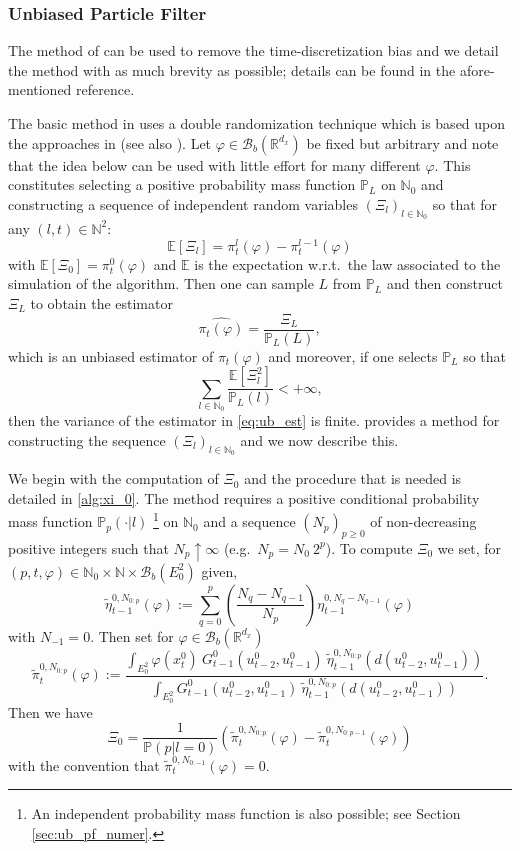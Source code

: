 \documentclass[english]{article}
\begin{document}
\subsubsection{Unbiased Particle Filter}

The method of \cite{ub_pf} can be used to remove the time-discretization bias and we detail the method with as much brevity as possible; details can be found in the afore-mentioned reference.

The basic method in \cite{ub_pf} uses a double randomization technique which is based upon the approaches in \cite{mcl,rhee} (see also \cite{vihola}). 
Let $\varphi\in\mathcal{B}_b(\mathbb{R}^{d_x})$ be fixed but arbitrary and note that the idea below can be used with little effort for many different $\varphi$.
This constitutes selecting a positive probability mass function $\mathbb{P}_L$ on $\mathbb{N}_0$ and
constructing a sequence of independent random variables $(\Xi_l)_{l\in\mathbb{N}_0}$ so that for any $(l,t)\in\mathbb{N}^2$:
$$
\mathbb{E}[\Xi_l] = \pi_t^l(\varphi) - \pi_t^{l-1}(\varphi)
$$
with $\mathbb{E}[\Xi_0] = \pi_t^0(\varphi)$ and $\mathbb{E}$ is the expectation w.r.t.~the law associated to the simulation of the algorithm. Then one can sample $L$ from $\mathbb{P}_L$ and then construct $\Xi_L$ to obtain
the estimator 
\begin{equation}\label{eq:ub_est}
\widehat{\pi_t(\varphi)} = \frac{\Xi_L}{\mathbb{P}_L(L)},
\end{equation}
which is an unbiased estimator of $ \pi_t(\varphi)$ and moreover, if one selects $\mathbb{P}_L$ so that
$$
\sum_{l\in\mathbb{N}_0}\frac{\mathbb{E}[\Xi_l^2]}{\mathbb{P}_L(l)} <+\infty,
$$
then the variance of the estimator in \eqref{eq:ub_est} is finite.
\cite{ub_pf} provides a method for constructing the sequence $(\Xi_l)_{l\in\mathbb{N}_0}$  and we now describe this.

We begin with the computation of $\Xi_0$ and the procedure that is needed is detailed in \autoref{alg:xi_0}.
The method requires a positive conditional probability mass function $\mathbb{P}_p(\cdot|l)$ \footnote{An independent probability mass function is also possible; see Section \ref{sec:ub_pf_numer}.} on $\mathbb{N}_0$ and a sequence
$(N_p)_{p\geq 0}$ of non-decreasing positive integers such that $N_p\uparrow\infty$ (e.g.~$N_p=N_0~ 2^p$). To compute
$\Xi_0$ we set, for $(p,t,\varphi)\in\mathbb{N}_0\times\mathbb{N} \times\mathcal{B}_b(E_0^2)$ given,
$$
\widetilde{\eta}_{t-1}^{0,N_{0:p}}(\varphi) := \sum_{q=0}^p \left(\frac{N_q-N_{q-1}}{N_p}\right)\eta_{t-1}^{0,N_q-N_{q-1}}(\varphi)
$$
with $N_{-1}=0$.
Then set for $\varphi\in\mathcal{B}_b(\mathbb{R}^{d_x})$
$$
\widetilde{\pi}_t^{0,N_{0:p}}(\varphi) := \frac{\int_{E_{0}^2} \varphi(x_t^0)~G_{t-1}^0(u_{t-2}^0,u_{t-1}^0) ~\widetilde{\eta}_{t-1}^{0,N_{0:p}}\left(d(u_{t-2}^0,u_{t-1}^0)\right)}
{\int_{E_{0}^2} G_{t-1}^0(u_{t-2}^0,u_{t-1}^0)~ \widetilde{\eta}_{t-1}^{0,N_{0:p}}\left(d(u_{t-2}^0,u_{t-1}^0)\right)}.
$$
Then we have
\begin{equation}\label{eq:xi_0}
\Xi_0 = \frac{1}{\mathbb{P}(p|l=0)}\left(\widetilde{\pi}_t^{0,N_{0:p}}(\varphi)-\widetilde{\pi}_t^{0,N_{0:p-1}}(\varphi)\right)
\end{equation}
with the convention that $\widetilde{\pi}_t^{0,N_{0:-1}}(\varphi)=0$.
\end{document}
